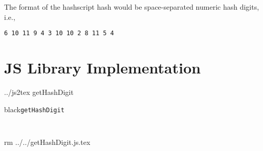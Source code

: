 \documentclass[letterpaper,twocolumn]{article}%
\begin{document}
The format of the hashscript hash would be space-separated
numeric hash digits, i.e., \begin{verbatim}6 10 11 9 4 3 10 10 2 8 11 5 4\end{verbatim}

\section{JS Library Implementation}


\bash[stdout]
../js2tex getHashDigit
\END
\begin{codebox}[label={myautocounter}]{black}{\texttt{\scriptsize getHashDigit}}

\begin{singlespace}
  
{\fontsize{5}{12} \selectfont %
\texttt{
  }}\end{singlespace}\end{codebox}%


\bash[stdout]
rm ../../getHashDigit.js.tex
\END
\end{document}
